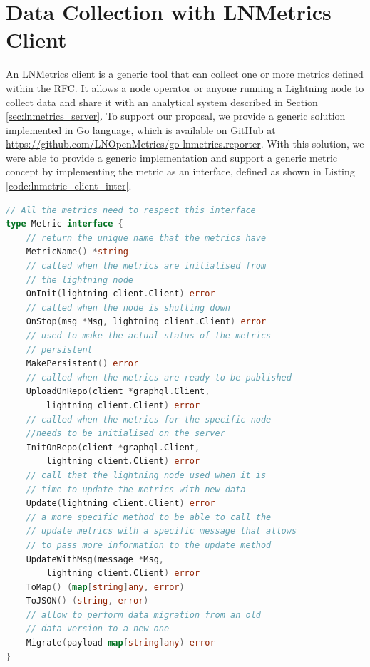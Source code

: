 \section{Data Collection with LNMetrics Client}
\label{sec:lnmetrics_client}

An LNMetrics client is a generic tool that can collect one or more metrics
defined within the RFC. It allows a node operator or anyone running a Lightning
node to collect data and share it with an analytical system described in 
Section \ref{sec:lnmetrics_server}. To support our proposal, we provide a
generic solution implemented in Go language, which is available on GitHub
at \url{https://github.com/LNOpenMetrics/go-lnmetrics.reporter}. With this
solution, we were able to provide a generic implementation and support a 
generic metric concept by implementing the metric as an interface, defined
as shown in Listing \ref{code:lnmetric_client_inter}.

\begin{lstlisting}[language=go, basicstyle=\small,
                  caption={Metric interface provided in our client reference implementation.}, 
                  label={code:lnmetric_client_inter}]
// All the metrics need to respect this interface
type Metric interface {
    // return the unique name that the metrics have
    MetricName() *string
    // called when the metrics are initialised from 
    // the lightning node
    OnInit(lightning client.Client) error
    // called when the node is shutting down
    OnStop(msg *Msg, lightning client.Client) error
    // used to make the actual status of the metrics
    // persistent
    MakePersistent() error
    // called when the metrics are ready to be published
    UploadOnRepo(client *graphql.Client, 
        lightning client.Client) error
    // called when the metrics for the specific node 
    //needs to be initialised on the server
    InitOnRepo(client *graphql.Client, 
        lightning client.Client) error
    // call that the lightning node used when it is 
    // time to update the metrics with new data
    Update(lightning client.Client) error
    // a more specific method to be able to call the 
    // update metrics with a specific message that allows 
    // to pass more information to the update method
    UpdateWithMsg(message *Msg, 
        lightning client.Client) error
    ToMap() (map[string]any, error)
    ToJSON() (string, error)
    // allow to perform data migration from an old 
    // data version to a new one
    Migrate(payload map[string]any) error
}
\end{lstlisting}

